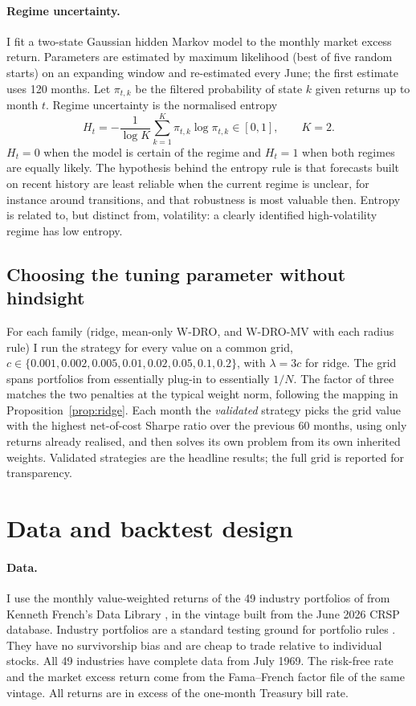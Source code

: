 \documentclass[11pt]{article}
\begin{document}
\paragraph{Regime uncertainty.} I fit a two-state Gaussian hidden Markov model \citep{hamilton1989} to the monthly market excess return. Parameters are estimated by maximum likelihood (best of five random starts) on an expanding window and re-estimated every June; the first estimate uses 120 months. Let $\pi_{t,k}$ be the filtered probability of state $k$ given returns up to month $t$. Regime uncertainty is the normalised entropy
\begin{equation}\label{eq:entropy}
H_t=-\frac{1}{\log K}\sum_{k=1}^{K}\pi_{t,k}\log\pi_{t,k}\in[0,1],\qquad K=2.
\end{equation}
$H_t=0$ when the model is certain of the regime and $H_t=1$ when both regimes are equally likely. The hypothesis behind the entropy rule is that forecasts built on recent history are least reliable when the current regime is unclear, for instance around transitions, and that robustness is most valuable then. Entropy is related to, but distinct from, volatility: a clearly identified high-volatility regime has low entropy.

\subsection{Choosing the tuning parameter without hindsight}
For each family (ridge, mean-only W-DRO, and W-DRO-MV with each radius rule) I run the strategy for every value on a common grid, $c\in\{0.001,0.002,0.005,0.01,0.02,0.05,0.1,0.2\}$, with $\lambda=3c$ for ridge. The grid spans portfolios from essentially plug-in to essentially $1/N$. The factor of three matches the two penalties at the typical weight norm, following the mapping in Proposition~\ref{prop:ridge}. Each month the \emph{validated} strategy picks the grid value with the highest net-of-cost Sharpe ratio over the previous 60 months, using only returns already realised, and then solves its own problem from its own inherited weights. Validated strategies are the headline results; the full grid is reported for transparency.

\section{Data and backtest design}\label{sec:data}

\paragraph{Data.} I use the monthly value-weighted returns of the 49 industry portfolios of \citet{fama1997} from Kenneth French's Data Library \citep{french2026}, in the vintage built from the June 2026 CRSP database. Industry portfolios are a standard testing ground for portfolio rules \citep{demiguel2009rfs}. They have no survivorship bias and are cheap to trade relative to individual stocks. All 49 industries have complete data from July 1969. The risk-free rate and the market excess return come from the Fama--French factor file of the same vintage. All returns are in excess of the one-month Treasury bill rate.
\end{document}
